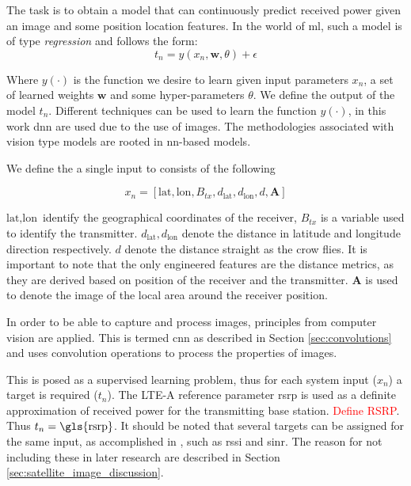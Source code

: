 The task is to obtain a model that can continuously predict received power given an image and some position location features. In the world of \gls{ml}, such a model is of type \emph{regression} and follows the form:
\begin{equation}\label{eq:dl_model_satellite}
    t_n = y(x_n, \mathbf{w}, \theta) + \epsilon
\end{equation}

Where $y(\cdot)$ is the function we desire to learn given input parameters $x_n$, a set of learned weights $\mathbf{w}$ and some hyper-parameters $\theta$. We define the output of the model $t_n$. Different techniques can be used to learn the function $y(\cdot)$, in this work \gls{dnn} are used due to the use of images. The methodologies associated with vision type models are rooted in \gls{nn}-based models.



We define the a single input to consists of the following

\begin{equation}\label{eq:dnn_inputs}
    x_n = [\text{lat}, \text{lon}, B_{tx}, d_{\text{lat}}, d_{\text{lon}}, d, \mathbf{A}]
\end{equation}

$\text{lat}, \text{lon}$ identify the geographical coordinates of the receiver, $B_{tx}$ is a variable used to identify the transmitter. $ d_{\text{lat}}, d_{\text{lon}} $ denote the distance in latitude and longitude direction respectively. $d$ denote the distance straight as the crow flies. It is important to note that the only engineered features are the distance metrics, as they are derived based on position of the receiver and the transmitter. $\mathbf{A}$ is used to denote the image of the local area around the receiver position. 

In order to be able to capture and process images, principles from computer vision are applied. This is termed \gls{cnn} as described in Section \ref{sec:convolutions} and uses convolution operations to process the properties of images.

This is posed as a supervised learning problem, thus for each system input ($x_n$) a target is required ($t_n$). The LTE-A reference parameter \gls{rsrp} is used as a definite approximation of received power for the transmitting base station. \textcolor{red}{Define RSRP}. Thus $t_n = \text{\gls{rsrp}}$. It should be noted that several targets can be assigned for the same input, as accomplished in \cite{Thrane2018DriveApproximation}, such as \gls{rssi} and \gls{sinr}. The reason for not including these in later research are described in Section \ref{sec:satellite_image_discussion}.

